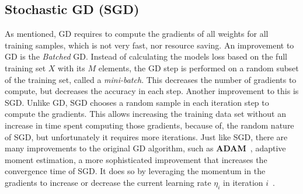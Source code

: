 \subsection{Stochastic GD (SGD)}\label{subsec:sgd}
As mentioned, GD requires to compute the gradients of all weights for all training samples, which is not very fast, nor resource saving.
An improvement to GD is the \textit{Batched} GD.
Instead of calculating the models loss based on the full training set $X$ with its $M$ elements, the GD step is performed on a random subset of the training set, called a \textit{mini-batch}.
This decreases the number of gradients to compute, but decreases the accuracy in each step.
Another improvement to this is SGD.
Unlike GD, SGD chooses a random sample in each iteration step to compute the gradients.
This allows increasing the training data set without an increase in time spent computing those gradients, because of, the random nature of SGD, but unfortunately it requires more iterations.
Just like SGD, there are many improvements to the original GD algorithm, such as \textbf{ADAM}~\cite{kingma_adam_2017}, adaptive moment estimation, a more sophisticated improvement that increases the convergence time of SGD.
It does so by leveraging the momentum in the gradients to increase or decrease the current learning rate $\eta_i$ in iteration $i$~\cite{GD-algos}.

